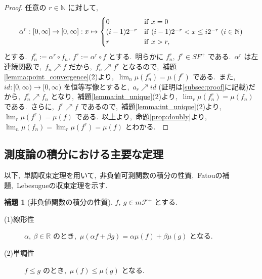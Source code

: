 \documentclass[a4j,11pt]{jarticle}
\theoremstyle{definition}
\newtheorem{lemma}[theorem]{補題}
\begin{document}
\begin{proof}
  任意の
  $r \in \mathbb{N}$
  に対して,\ 
  \begin{equation}
    \alpha^r:\left[ 0,\infty\right] \to \left[ 0,\infty\right]:x\mapsto
    \begin{cases}
      0 & {\rm if}\ x=0 \\
      (i-1)2^{-r} & {\rm if}\ (i-1)2^{-r} < x \leq i2^{-r} \ (i\in\mathbb{N}) \\
      r & {\rm if} \ x > r,
    \end{cases}
  \end{equation}
  とする.\ 
  $f_n^r:=\alpha^r \circ f_n,\ f^r:=\alpha^r \circ f$
  とする.\ 
  明らかに
  $f_n^r,\ f^r \in SF^+$
  である.\ 
  $\alpha^r$
  は左連続関数で,\ 
  $f_n \nearrow f$
  だから,\ 
  $f_n^r \nearrow f^r$
  となるので,\ 補題\ref{lemma:point_convergence}(2)より,\ 
  $\lim_n \mu(f_n^r) = \mu(f^r)$
  である.\ 
  また,\ 
  $id:[0,\infty) \to [0,\infty)$
  を恒等写像とすると,\ 
  $a_r \nearrow id$
  (証明は\ref{subsec:proof}に記載)だから,\ 
  $f_n^r \nearrow f_n$
  となり,\ 補題\ref{lemma:int_unique}(2)より,\ 
  $\lim_r \mu(f_n^r) = \mu(f_n)$
  である.\ 
  さらに,\ 
  $f^r \nearrow f$
  であるので,\ 補題\ref{lemma:int_unique}(2)より,\ 
  $\lim_r \mu(f^r) = \mu(f)$
  である.\ 
  以上より,\ 命題\ref{prop:doubly}より,\ 
  $\lim_n \mu(f_n) = \lim_r \mu(f^r) = \mu(f)$
  とわかる.\ 
\end{proof}

\subsection{測度論の積分における主要な定理}
以下,\ 単調収束定理を用いて,\ 非負値可測関数の積分の性質,\ Fatouの補題,\ Lebesugueの収束定理を示す.\ 

\begin{lemma}[非負値関数の積分の性質]
  $f,\ g\in m\mathcal{F}^+$
  とする.\ 
  \begin{description}
    \item[(1)線形性]
      $\alpha,\ \beta \in \mathbb{R}$
      のとき,\ 
      $\mu(\alpha f + \beta g) = \alpha \mu(f) + \beta \mu(g)$
      となる.\ 
    \item[(2)単調性]
      $f \leq g$
      のとき,\ 
      $\mu(f) \leq \mu(g)$
      となる.\ 
  \end{description}
\end{lemma}
\end{document}
